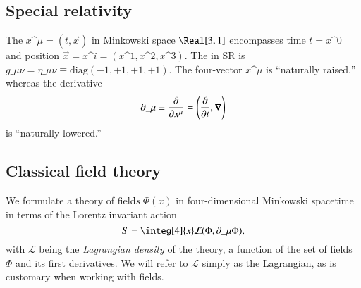 



\subsection{Special relativity}
    The  $x\^\mu=(t, \vec{x})$ in Minkowski space $\Real[3,1]$ encompasses time $t=x\^0$ and position $\vec{x}=x\^i= (x\^1, x\^2, x\^3)$. The  in SR is $g\_{\mu\nu}= \eta\_{\mu\nu} \equiv \text{diag} (-1,+1,+1,+1)$. The four-vector $x\^\mu$ is ``naturally raised,'' whereas the derivative
    \begin{equation}
        \partial\_\mu \equiv \pdv{}{x\^\mu} =\pclosed{ \pdv{}{t}, \vec{\nabla} }
    \end{equation}
    is ``naturally lowered.'' 





\subsection{Classical field theory}
    We formulate a theory of field\emph{s} $\Phi(x)$ in four-dimensional Minkowski spacetime in terms of the Lorentz invariant action
    \begin{equation}
        S = \integ[4]{x} \mathcal{L}(\Phi, \partial\_\mu \Phi),
    \end{equation}
    with $\mathcal{L}$ being the \emph{Lagrangian density} of the theory, a function of the set of fields $\Phi$ and its first derivatives. We will refer to $\mathcal{L}$ simply as the Lagrangian, as is customary when working with fields. 

